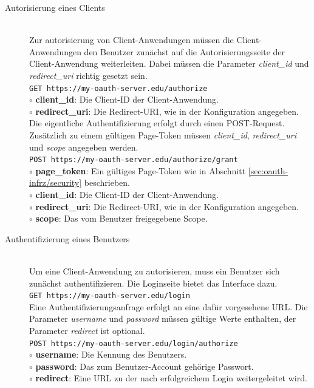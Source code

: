 \documentclass[12pt,a4paper,pointednumbers,abstracton]{scrartcl}
\newcommand{\code}[1]{\small\lstinline[style=InlinePHP]!#1!\normalsize}
\begin{document}
\begin{description}
	\item[Autorisierung eines Clients] \hfill \\
		Zur autorisierung von Client-Anwendungen müssen die Client-Anwendungen den Benutzer zunächst auf die Autorisierungsseite der Client-Anwendung weiterleiten.
		Dabei müssen die Parameter \emph{client\_id} und \emph{redirect\_uri} richtig gesetzt sein.\\
		\code{GET https://my-oauth-server.edu/authorize}\\
		$\circ$ \textbf{client\_id}: Die Client-ID der Client-Anwendung.\\
		$\circ$ \textbf{redirect\_uri}: Die Redirect-URI, wie in der Konfiguration angegeben.\\[0.7em]
		Die eigentliche Authentifizierung erfolgt durch einen POST-Request.
		Zusätzlich zu einem gültigen Page-Token müssen \emph{client\_id}, \emph{redirect\_uri} und \emph{scope} angegeben werden.\\
		\code{POST https://my-oauth-server.edu/authorize/grant}\\
		$\circ$ \textbf{page\_token}: Ein gültiges Page-Token wie in Abschnitt \ref{sec:oauth-infrz/security} beschrieben.\\
		$\circ$ \textbf{client\_id}: Die Client-ID der Client-Anwendung.\\
		$\circ$ \textbf{redirect\_uri}: Die Redirect-URI, wie in der Konfiguration angegeben.\\
		$\circ$ \textbf{scope}: Das vom Benutzer freigegebene Scope.
	\item[Authentifizierung eines Benutzers] \hfill \\
		Um eine Client-Anwendung zu autorisieren, muss ein Benutzer sich zunächst authentifizieren.
		Die Loginseite bietet das Interface dazu.\\
		\code{GET https://my-oauth-server.edu/login}\\[0.7em]
		Eine Authentifizierungsanfrage erfolgt an eine dafür vorgesehene URL.
		Die Parameter \emph{username} und \emph{password} müssen gültige Werte enthalten, der Parameter \emph{redirect} ist optional.\\
		\code{POST https://my-oauth-server.edu/login/authorize}\\
		$\circ$ \textbf{username}: Die Kennung des Benutzers.\\
		$\circ$ \textbf{password}: Das zum Benutzer-Account gehörige Passwort.\\
		$\circ$ \textbf{redirect}: Eine URL zu der nach erfolgreichem Login weitergeleitet wird.\\[0.7em]

\end{description}
\end{document}
